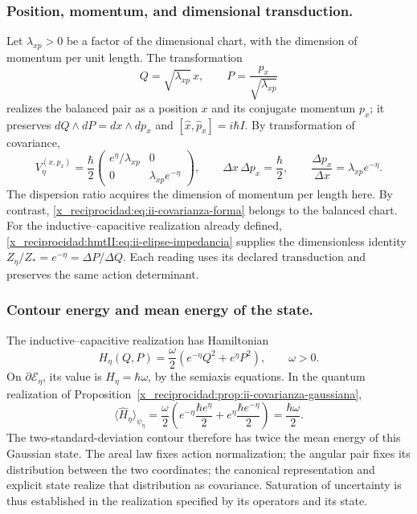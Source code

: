 \subsubsection{Position, momentum, and dimensional transduction.}
Let \(\lambda_{xp}>0\) be a factor of the dimensional chart, with the dimension of momentum per unit length. The transformation
\[
 Q=\sqrt{\lambda_{xp}}\,x,\qquad
 P=\frac{p_x}{\sqrt{\lambda_{xp}}}
\]
realizes the balanced pair as a position \(x\) and its conjugate momentum
\(p_x\); it preserves \(dQ\wedge dP=dx\wedge dp_x\) and
\([\widehat x,\widehat p_x]=i\hbar I\). By transformation of
covariance,
\begin{equation}
 V_\eta^{(x,p_x)}=\frac{\hbar}{2}
 \begin{pmatrix}e^\eta/\lambda_{xp}&0\\
                 0&\lambda_{xp}e^{-\eta}\end{pmatrix},\qquad
 \Delta x\,\Delta p_x=\frac{\hbar}{2},\qquad
 \frac{\Delta p_x}{\Delta x}=\lambda_{xp}e^{-\eta}.
 \label{x_reciprocidad:eq:ii-covarianza-dimensiones}
\end{equation}
The dispersion ratio acquires the dimension of momentum per length here. By contrast, \eqref{x_reciprocidad:eq:ii-covarianza-forma} belongs to the balanced chart. For the inductive--capacitive realization already defined, \eqref{x_reciprocidad:hmtII:eq:ii-elipse-impedancia} supplies the dimensionless identity \(Z_\eta/Z_*=e^{-\eta}=\Delta P/\Delta Q\). Each reading uses its declared transduction and preserves the same action determinant.

\subsubsection{Contour energy and mean energy of the state.}
The inductive--capacitive realization has Hamiltonian
\[
 H_\eta(Q,P)=\frac{\omega}{2}
 \left(e^{-\eta}Q^2+e^\eta P^2\right),\qquad \omega>0.
\]
On \(\partial\mathcal E_\eta\), its value is
\(H_\eta=\hbar\omega\), by the semiaxis equations. In the
quantum realization of Proposition~\ref{x_reciprocidad:prop:ii-covarianza-gaussiana},
\begin{equation}
 \langle\widehat H_\eta\rangle_{\psi_\eta}
 =\frac{\omega}{2}
 \left(e^{-\eta}\frac{\hbar e^\eta}{2}
       +e^\eta\frac{\hbar e^{-\eta}}{2}\right)
 =\frac{\hbar\omega}{2}.
 \label{x_reciprocidad:eq:ii-energia-contorno-covarianza}
\end{equation}
The two-standard-deviation contour therefore has twice the
mean energy of this Gaussian state. The areal law fixes action
normalization; the angular pair fixes its distribution between the two coordinates;
the canonical representation and explicit state realize that distribution
as covariance. Saturation of uncertainty is thus established in
the realization specified by its operators and its state.

